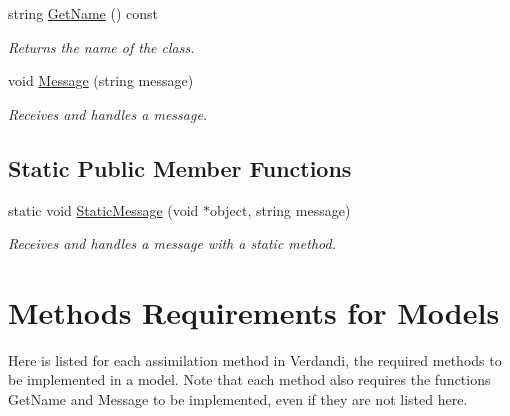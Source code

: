 \documentclass{tufte-book}
\begin{document}
\begin{DoxyCompactItemize}
string \hyperlink{class_verdandi_1_1_model_template_a1451871cba68257c573f23f5ba39083a}{\-Get\-Name} () const
\begin{DoxyCompactList}\small\item\em \-Returns the name of the class. \end{DoxyCompactList}\item
\hypertarget{class_verdandi_1_1_model_template_a202b6841e06cae68b9739e57f5073f48}{
void \hyperlink{class_verdandi_1_1_model_template_a202b6841e06cae68b9739e57f5073f48}{\-Message} (string message)}
\label{class_verdandi_1_1_model_template_a202b6841e06cae68b9739e57f5073f48}

\begin{DoxyCompactList}\small\item\em \-Receives and handles a message. \end{DoxyCompactList}\end{DoxyCompactItemize}
\subsection{\-Static \-Public \-Member \-Functions}
\begin{DoxyCompactItemize}
\item
\hypertarget{class_verdandi_1_1_verdandi_base_a6dcc96ec9661a4cbf152955adb9dc990}{
static void \hyperlink{class_verdandi_1_1_verdandi_base_a6dcc96ec9661a4cbf152955adb9dc990}{\-Static\-Message} (void $\ast$object, string message)}
\label{class_verdandi_1_1_verdandi_base_a6dcc96ec9661a4cbf152955adb9dc990}

\begin{DoxyCompactList}\small\item\em \-Receives and handles a message with a static method. \end{DoxyCompactList}\end{DoxyCompactItemize}




\hypertarget{model_requirement_page}{
\section{Methods Requirements for Models}
\label{model_requirement_page}
}



Here is listed for each assimilation method in Verdandi, the required methods to be implemented in a model. Note that each method also requires the functions
GetName and Message to be implemented, even if they are not listed here.
\end{document}
